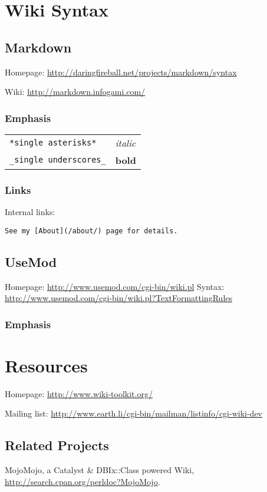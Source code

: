 \section{Wiki Syntax}
\subsection{Markdown}
Homepage: \url{http://daringfireball.net/projects/markdown/syntax}

Wiki: \url{http://markdown.infogami.com/}

\subsubsection{Emphasis}

\begin{tabular}{ll}
\verb|*single asterisks*| & \textit{italic} \\
\verb|_single underscores_| & \textbf{bold} \\
\end{tabular}


\subsubsection{Links}
Internal links:

\begin{verbatim}
See my [About](/about/) page for details.
\end{verbatim}

\subsection{UseMod}
Homepage: \url{http://www.usemod.com/cgi-bin/wiki.pl}
Syntax: \url{http://www.usemod.com/cgi-bin/wiki.pl?TextFormattingRules}

\subsubsection{Emphasis}

\section{Resources}

Homepage: \url{http://www.wiki-toolkit.org/}

Mailing list: \url{http://www.earth.li/cgi-bin/mailman/listinfo/cgi-wiki-dev}

\subsection{Related Projects}
MojoMojo, a Catalyst \& DBIx::Class powered Wiki,
\url{http://search.cpan.org/perldoc?MojoMojo}.


    
